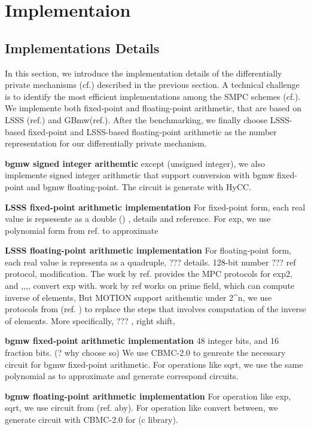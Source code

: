 \chapter{Implementaion}
\label{cha:implementations}


\section{Implementations Details}
\label{sec:implementationsdetails}

In this section, we introduce the implementation details of the differentially private mechanisms (cf.) described in the previous section. A technical challenge is to identify the most efficient implementations among the SMPC schemes (cf.). We implemente both fixed-point and floating-point arithmetic, that are based on LSSS (ref.) and GBmw(ref.). After the benchmarking, we finally choose LSSS-based fixed-point and LSSS-based floating-point arithmetic as the number representation for our differentially private mechanism. 

\textbf{bgmw signed integer arithemtic}
except (unsigned integer), we also implemente signed integer arithmetic that support conversion with bgmw fixed-point and bgmw floating-point. The circuit is generate with HyCC. 


\textbf{LSSS fixed-point arithmetic implementation}
For fixed-point form, each real value is repsesente as a double () , details and reference. For exp, we use polynomial form from ref. to approximate 

\textbf{LSSS floating-point arithmetic implementation}
For floating-point form, each real value is representa as a quadruple, ??? details.
128-bit number
??? ref protocol, modification. The work by ref. provides the MPC protocols for exp2, and ,,,,
convert exp with. 
work by ref works on prime field, which can compute inverse of elements,
But MOTION support arithemtic under 2^n, we use protocols from (ref. ) to replace the steps that involves computation of the inverse of elements. More specifically, ??? , right shift, 



\textbf{bgmw fixed-point arithmetic implementation}
48 integer bits, and 16 fraction bits. (? why choose so)
We use CBMC-2.0 to genreate the necessary circuit for bgmw fixed-point arithmetic. For operations like sqrt, we use the same polynomial as to approximate and generate correspond circuits. 


\textbf{bgmw floating-point arithmetic implementation}
For operation like exp, sqrt, we use circuit from (ref. aby). 
For operation like convert between, we generate circuit with CBMC-2.0 for (c library).



